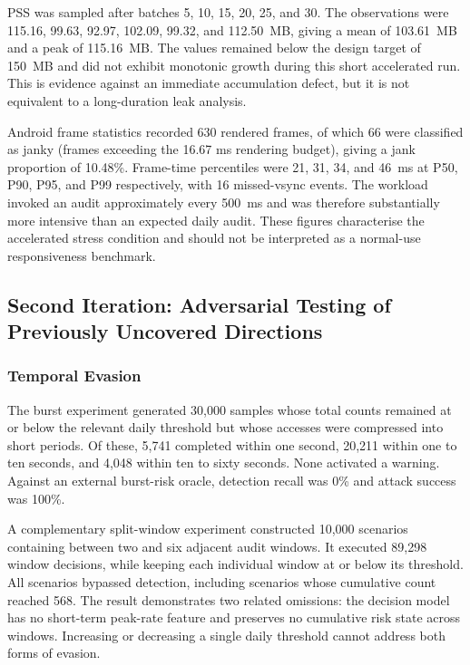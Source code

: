 PSS was sampled after batches 5, 10, 15, 20, 25, and 30. The observations were 115.16, 99.63, 92.97, 102.09, 99.32, and 112.50~MB, giving a mean of 103.61~MB and a peak of 115.16~MB. The values remained below the design target of 150~MB and did not exhibit monotonic growth during this short accelerated run. This is evidence against an immediate accumulation defect, but it is not equivalent to a long-duration leak analysis.

Android frame statistics recorded 630 rendered frames, of which 66 were classified as janky (frames exceeding the 16.67 ms rendering budget), giving a jank proportion of 10.48\%. Frame-time percentiles were 21, 31, 34, and 46~ms at P50, P90, P95, and P99 respectively, with 16 missed-vsync events. The workload invoked an audit approximately every 500~ms and was therefore substantially more intensive than an expected daily audit. These figures characterise the accelerated stress condition and should not be interpreted as a normal-use responsiveness benchmark.

\subsection{Second Iteration: Adversarial Testing of Previously Uncovered Directions}

\subsubsection{Temporal Evasion}

The burst experiment generated 30,000 samples whose total counts remained at or below the relevant daily threshold but whose accesses were compressed into short periods. Of these, 5,741 completed within one second, 20,211 within one to ten seconds, and 4,048 within ten to sixty seconds. None activated a warning. Against an external burst-risk oracle, detection recall was 0\% and attack success was 100\%.

A complementary split-window experiment constructed 10,000 scenarios containing between two and six adjacent audit windows. It executed 89,298 window decisions, while keeping each individual window at or below its threshold. All scenarios bypassed detection, including scenarios whose cumulative count reached 568. The result demonstrates two related omissions: the decision model has no short-term peak-rate feature and preserves no cumulative risk state across windows. Increasing or decreasing a single daily threshold cannot address both forms of evasion.

